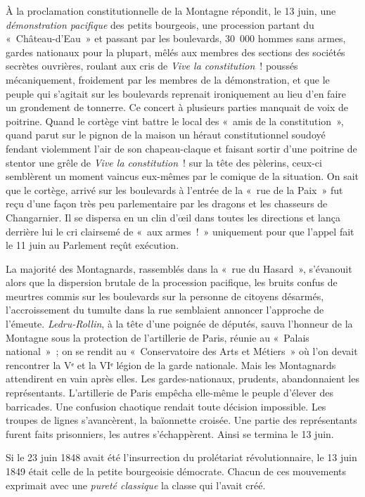 \documentclass[twoside]{book} %
\begin{document}
À la proclamation constitutionnelle de la Montagne répondit, le 13 juin, une \emph{démonstration pacifique} des petits bourgeois, une procession partant du « Château-d’Eau » et passant par les boulevards, 30 000 hommes sans armes, gardes nationaux pour la plupart, mêlés aux membres des sections des sociétés secrètes ouvrières, roulant aux cris de \emph{Vive la constitution} ! poussés mécaniquement, froidement par les membres de la démonstration, et que le peuple qui s’agitait sur les boulevards reprenait ironiquement au lieu d’en faire un grondement de tonnerre. Ce concert à plusieurs parties manquait de voix de poitrine. Quand le cortège vint battre le local des « amis de la constitution », quand parut sur le pignon de la maison un héraut constitutionnel soudoyé fendant violemment l’air de son chapeau-claque et faisant sortir d’une poitrine de stentor une grêle de \emph{Vive la constitution} ! sur la tête des pèlerins, ceux-ci semblèrent un moment vaincus eux-mêmes par le comique de la situation. On sait que le cortège, arrivé sur les boulevards à l’entrée de la « rue de la Paix » fut reçu d’une façon très peu parlementaire par les dragons et les chasseurs de Changarnier. Il se dispersa en un clin d’œil dans toutes les directions et lança derrière lui le cri clairsemé de « aux armes ! » uniquement pour que l’appel fait le 11 juin au Parlement reçût exécution.\par
La majorité des Montagnards, rassemblés dans la « rue du Hasard », s’évanouit alors que la dispersion brutale de la procession pacifique, les bruits confus de meurtres commis sur les boulevards sur la personne de citoyens désarmés, l’accroissement du tumulte dans la rue semblaient annoncer l’approche de l’émeute. \emph{Ledru-Rollin}, à la tête d’une poignée de députés, sauva l’honneur de la Montagne sous la protection de l’artillerie de Paris, réunie au « Palais national » ; on se rendit au « Conservatoire des Arts et Métiers » où l’on devait rencontrer la Vᵉ et la VIᵉ légion de la garde nationale. Mais les Montagnards attendirent en vain après elles. Les gardes-nationaux, prudents, abandonnaient les représentants. L’artillerie de Paris empêcha elle-même le peuple d’élever des barricades. Une confusion chaotique rendait toute décision impossible. Les troupes de lignes s’avancèrent, la baïonnette croisée. Une partie des représentants furent faits prisonniers, les autres s’échappèrent. Ainsi se termina le 13 juin.\par
Si le 23 juin 1848 avait été l’insurrection du prolétariat révolutionnaire, le 13 juin 1849 était celle de la petite bourgeoisie démocrate. Chacun de ces mouvements exprimait avec une \emph{pureté classique} la classe qui l’avait créé.\par
\end{document}
